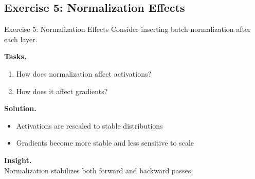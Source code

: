 \documentclass[aspectratio=169,11pt]{beamer}
\begin{document}
\subsection{Exercise 5: Normalization Effects}
\begin{frame}[t,allowframebreaks]{Exercise 5: Normalization Effects}
\small
Consider inserting batch normalization after each layer.

\textbf{Tasks.}\\ \begin{enumerate}
    \item How does normalization affect activations?
    \item How does it affect gradients?
\end{enumerate}

\textbf{Solution.}\\ \begin{itemize}
    \item Activations are rescaled to stable distributions
    \item Gradients become more stable and less sensitive to scale
\end{itemize}

\textbf{Insight.}\\ Normalization stabilizes both forward and backward passes.
\end{frame}
\end{document}
